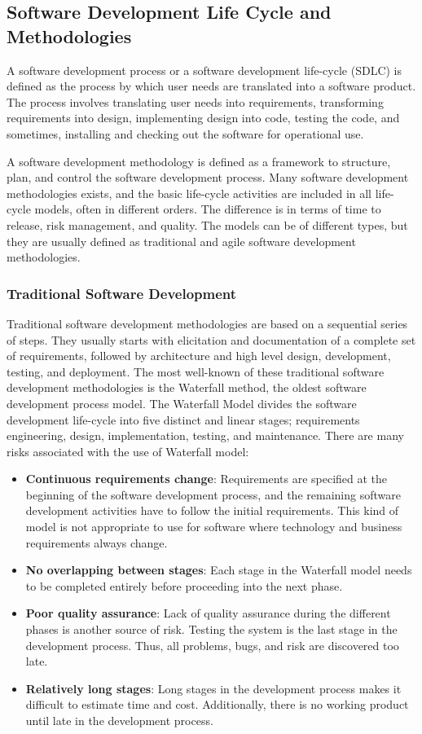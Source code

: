 \subsection{Software Development Life Cycle and Methodologies} %
A software development process or a software development life-cycle (SDLC) is defined as the process by which user needs are translated into a software product\cite{radatz1990ieee}. The process involves translating user needs into requirements, transforming requirements into design, implementing design into code, testing the code, and sometimes, installing and checking out the software for operational use.

A software development methodology is defined as a framework to structure, plan, and control the software development process. Many software development methodologies exists, and the basic life-cycle activities are included in all life-cycle models, often in different orders. The difference is in terms of time to release, risk management, and quality. The models can be of different types, but they are usually defined as traditional and agile software development methodologies.

\subsubsection{Traditional Software Development}
Traditional software development methodologies are based on a sequential series of steps. They usually starts with elicitation and documentation of a complete set of requirements, followed by architecture and high level design, development, testing, and deployment. The most well-known of these traditional software development methodologies is the Waterfall method, the oldest software development process model\cite{krogstie2012model}. The Waterfall Model divides the software development life-cycle into five distinct and linear stages\cite{Vliet:2008:SEP:1481475}; requirements engineering, design, implementation, testing, and maintenance. There are many risks associated with the use of Waterfall model\cite{hijazi2012review}:
\begin{itemize}
	\item \textbf{Continuous requirements change}: Requirements are specified at the beginning of the software development process, and the remaining software development activities have to follow the initial requirements. This kind of model is not appropriate to use for software where technology and business requirements always change. 
	\item \textbf{No overlapping between stages}: Each stage in the Waterfall model needs to be completed entirely before proceeding into the next phase.
	\item \textbf{Poor quality assurance}: Lack of quality assurance during the different phases is another source of risk. Testing the system is the last stage in the development process. Thus, all problems, bugs, and risk are discovered too late.
	\item \textbf{Relatively long stages}: Long stages in the development process makes it difficult to estimate time and cost. Additionally, there is no working product until late in the development process. 
\end{itemize}

